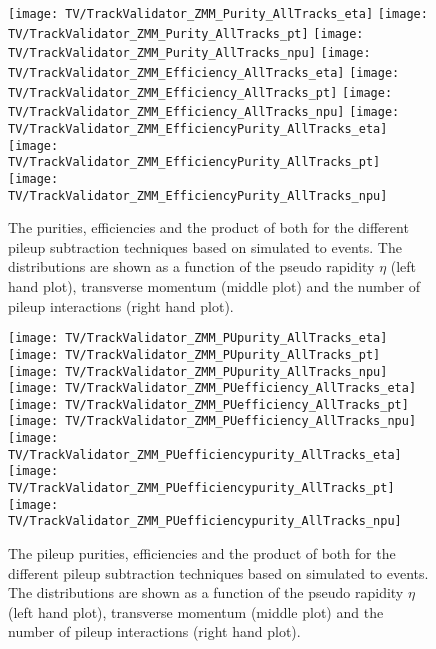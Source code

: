 \begin{figure}[h!t]
  \centering
  \texttt{[image: TV/TrackValidator\_ZMM\_Purity\_AllTracks\_eta]}
  \texttt{[image: TV/TrackValidator\_ZMM\_Purity\_AllTracks\_pt]}
  \texttt{[image: TV/TrackValidator\_ZMM\_Purity\_AllTracks\_npu]}
  \newline
  \texttt{[image: TV/TrackValidator\_ZMM\_Efficiency\_AllTracks\_eta]}
  \texttt{[image: TV/TrackValidator\_ZMM\_Efficiency\_AllTracks\_pt]}
  \texttt{[image: TV/TrackValidator\_ZMM\_Efficiency\_AllTracks\_npu]}
  \newline
  \texttt{[image: TV/TrackValidator\_ZMM\_EfficiencyPurity\_AllTracks\_eta]}
  \texttt{[image: TV/TrackValidator\_ZMM\_EfficiencyPurity\_AllTracks\_pt]}
  \texttt{[image: TV/TrackValidator\_ZMM\_EfficiencyPurity\_AllTracks\_npu]}
  \caption[Purity, efficiency and their product for the different pileup subtraction techniques based on simulated \Zz to \MM events]{The purities, efficiencies and the product of both for the different pileup subtraction techniques based on simulated \Zz to \MM events. The distributions are shown as a function of the pseudo rapidity $\eta$ (left hand plot), transverse momentum (middle plot) and the number of pileup interactions (right hand plot). \label{plot:TACOAACPZMMSignal}}
\end{figure}

\begin{figure}[h!t]
  \centering
  \texttt{[image: TV/TrackValidator\_ZMM\_PUpurity\_AllTracks\_eta]}
  \texttt{[image: TV/TrackValidator\_ZMM\_PUpurity\_AllTracks\_pt]}
  \texttt{[image: TV/TrackValidator\_ZMM\_PUpurity\_AllTracks\_npu]}
  \newline
  \texttt{[image: TV/TrackValidator\_ZMM\_PUefficiency\_AllTracks\_eta]}
  \texttt{[image: TV/TrackValidator\_ZMM\_PUefficiency\_AllTracks\_pt]}
  \texttt{[image: TV/TrackValidator\_ZMM\_PUefficiency\_AllTracks\_npu]}
  \newline
  \texttt{[image: TV/TrackValidator\_ZMM\_PUefficiencypurity\_AllTracks\_eta]}
  \texttt{[image: TV/TrackValidator\_ZMM\_PUefficiencypurity\_AllTracks\_pt]}
  \texttt{[image: TV/TrackValidator\_ZMM\_PUefficiencypurity\_AllTracks\_npu]}
  \caption[Pileup purity, efficiency and their product for the different pileup subtraction techniques based on simulated \Zz to \MM events]{The pileup purities, efficiencies and the product of both for the different pileup subtraction techniques based on simulated \Zz to \MM events. The distributions are shown as a function of the pseudo rapidity $\eta$ (left hand plot), transverse momentum (middle plot) and the number of pileup interactions (right hand plot). \label{plot:TACOAACPZMMPileup}}
\end{figure}

